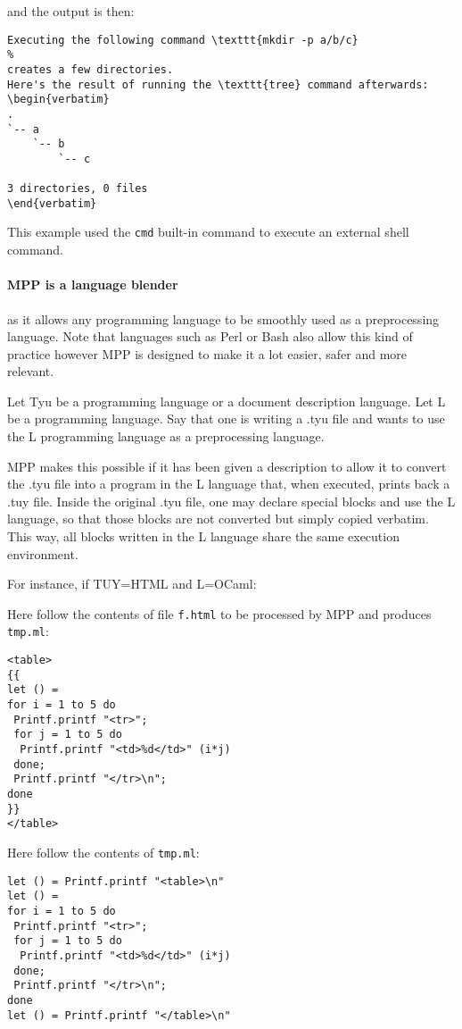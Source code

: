 \documentclass[a4paper]{article}
\begin{document}
and the output is then:
\begin{lstlisting}
Executing the following command \texttt{mkdir -p a/b/c} 
% 
creates a few directories.
Here's the result of running the \texttt{tree} command afterwards:  
\begin{verbatim}
.
`-- a
    `-- b
        `-- c

3 directories, 0 files
\end{verbatim}
\end{lstlisting}
This example used the \texttt{cmd} built-in command to execute an external
shell command.

\paragraph{MPP  is a language  blender} as  it allows  any programming
language to  be smoothly used  as a preprocessing language.   Note that
languages  such as  Perl  or Bash  also  allow this  kind of  practice
however  MPP is  designed to  make  it a  lot easier,  safer and  more
relevant.

Let Tyu be a programming  language or a document description language.
Let L be a programming language.   Say that one is writing a .tyu file
and  wants  to  use  the  L programming  language  as  a  preprocessing
language. 

MPP makes this possible if it has been given a description to allow it
to convert the  .tyu file into a program in the  L language that, when
executed, prints back a .tuy  file. Inside the original .tyu file, one
may  declare special  blocks and  use the  L language,  so  that those
blocks are not converted but simply copied verbatim.
This way, all blocks written in the L language share the same execution
environment.

For instance, if TUY=HTML and L=OCaml:

Here follow the contents of file \texttt{f.html} to be processed by MPP and produces
\texttt{tmp.ml}:
\begin{lstlisting}
<table>
{{
let () = 
for i = 1 to 5 do
 Printf.printf "<tr>";
 for j = 1 to 5 do
  Printf.printf "<td>%d</td>" (i*j)
 done;
 Printf.printf "</tr>\n";
done
}}
</table>
\end{lstlisting}

Here follow the contents of \texttt{tmp.ml}:
\begin{lstlisting}
let () = Printf.printf "<table>\n"
let () = 
for i = 1 to 5 do
 Printf.printf "<tr>";
 for j = 1 to 5 do
  Printf.printf "<td>%d</td>" (i*j)
 done;
 Printf.printf "</tr>\n";
done
let () = Printf.printf "</table>\n"
\end{lstlisting}
\end{document}
